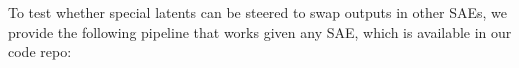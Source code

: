 







To test whether special latents can be steered to swap outputs in other SAEs, we provide the following pipeline that works given any SAE, which is available in our code repo:
